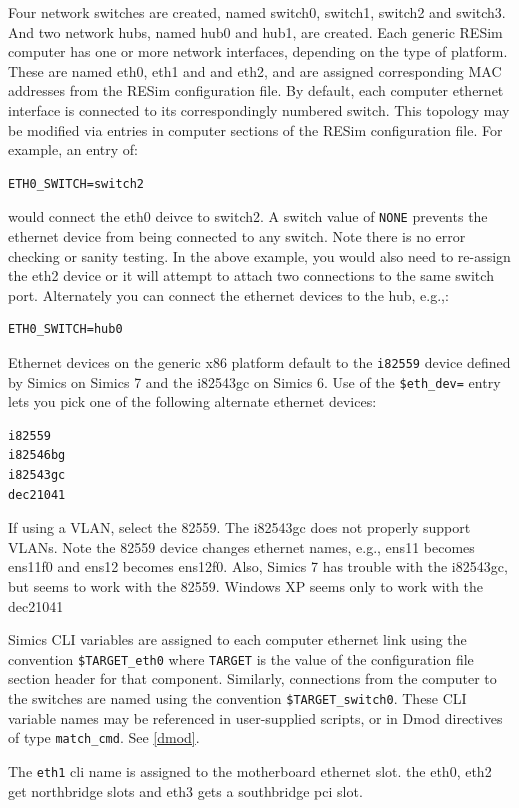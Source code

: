 \documentclass[titlepage]{article}
\begin{document}
Four network switches are created, named switch0, switch1, switch2 and switch3. And two network hubs, named hub0 and hub1, are created.  
Each generic RESim computer has one or more network interfaces,
depending on the type of platform.
These are named eth0, eth1 and and eth2, and are assigned corresponding MAC addresses from the
RESim configuration file. By default, each computer ethernet interface is connected to its correspondingly numbered switch.
This topology may be modified via entries in computer sections of the RESim configuration file.  For example, an entry of:
\begin{verbatim}
ETH0_SWITCH=switch2
\end{verbatim}
\noindent would connect the eth0 deivce to switch2.  A switch value of {\tt NONE} prevents the ethernet device from being connected
to any switch.  Note there is no error checking or sanity testing.  In the above example, you would also need to re-assign the eth2 device
or it will attempt to attach two connections to the same switch port.
Alternately you can connect the ethernet devices to the hub, e.g.,:
\begin{verbatim}
ETH0_SWITCH=hub0
\end{verbatim}

Ethernet devices on the generic x86 platform default to the {\tt i82559} device defined by Simics on Simics 7 and the i82543gc on Simics 6.  Use of the {\tt \$eth\_dev=} 
entry lets you pick one of the following alternate ethernet devices:
\begin{verbatim}
i82559
i82546bg
i82543gc
dec21041
\end{verbatim}

If using a VLAN, select the 82559.  The i82543gc does not properly support VLANs.
Note the 82559 device changes ethernet names, e.g., ens11 becomes ens11f0 and ens12 becomes ens12f0.
Also, Simics 7 has trouble with the i82543gc, but seems to work with the 82559.
Windows XP seems only to work with the dec21041

Simics CLI variables are assigned to each computer ethernet link using the convention {\tt \$TARGET\_eth0} where {\tt TARGET}
is the value of the configuration file section header for that component.  Similarly, connections from the computer to the switches 
are named using the convention {\tt \$TARGET\_switch0}.  These CLI variable names may be referenced in user-supplied scripts, or in 
Dmod directives of type {\tt match\_cmd}.  See \ref{dmod}.

The {\tt eth1} cli name is assigned to the motherboard ethernet slot. the eth0, eth2 get northbridge slots and eth3 gets a southbridge pci slot.
\end{document}
